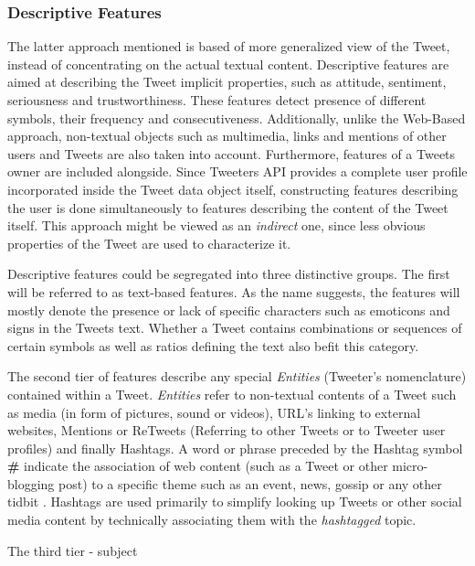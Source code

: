		
		\subsubsection{Descriptive Features}
		The latter approach mentioned is based of more generalized view of the Tweet, instead of concentrating on the actual textual content. Descriptive features are aimed at describing the Tweet implicit properties, such as attitude, sentiment, seriousness and trustworthiness. These features detect presence of different symbols, their frequency and consecutiveness. Additionally, unlike the Web-Based approach, non-textual objects such as multimedia, links and mentions of other users and Tweets are also taken into account. Furthermore, features of a Tweets owner are included alongside. Since Tweeters API provides a complete user profile incorporated inside the Tweet data object itself, constructing features describing the user is done simultaneously to features describing the content of the Tweet itself. This approach might be viewed as an \textit{indirect} one, since less obvious properties of the Tweet are used to characterize it.
		\par
		Descriptive features could be segregated into three distinctive groups. The first will be referred to as text-based features. As the name suggests, the features will mostly denote the presence or lack of specific characters such as emoticons and signs in the Tweets text. Whether a Tweet contains combinations or sequences of certain symbols as well as ratios defining the text also befit this category.
		\par
		The second tier of features describe any special \textit{Entities} (Tweeter's nomenclature) contained within a Tweet. \textit{Entities} refer to non-textual contents of a Tweet such as media (in form of pictures, sound or videos), URL's linking to external websites, Mentions or ReTweets (Referring to other Tweets or to Tweeter user profiles) and finally Hashtags. A word or phrase preceded by the Hashtag symbol \textbf{\#} indicate the association of web content (such as a Tweet or other micro-blogging post) to a specific theme such as an event, news, gossip or any other tidbit \cite{dict_Tweet}. Hashtags are used primarily to simplify looking up Tweets or other social media content by technically associating them with the \textit{hashtagged} topic.
		\par
		{\color{red}The third tier - subject}
		
				